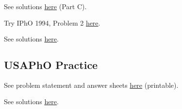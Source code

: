 \documentclass[11pt]{scrartcl}
\begin{document}
\begin{sol}
    See solutions \href{https://s3.eu-central-1.amazonaws.com/physprob.com/files/ipho/2014_Kazakhstan_p1Sol.pdf}{here} (Part C).
\end{sol}

\begin{prob}[IPhO]
    Try IPhO 1994, Problem 2 \href{https://s3.eu-central-1.amazonaws.com/physprob.com/files/ipho/1994_China_p2.pdf}{here}.
\end{prob}

\begin{sol}
    See solutions \href{https://s3.eu-central-1.amazonaws.com/physprob.com/files/ipho/1994_China_p2Sol.pdf}{here}.
\end{sol}

\subsection{USAPhO Practice}

\begin{prob}[USAPhO 2018 A2]
    See problem statement and answer sheets \href{https://drive.google.com/file/d/1Ppyd31iieYWaprdalgzkgx8ewSoMahxF/view?usp=sharing}{here} (printable).
\end{prob}

\begin{sol}
    See solutions \href{https://aapt.org/physicsteam/2019/upload/USAPhO-2018-Solutions.pdf}{here}.
\end{sol}
\end{document}
